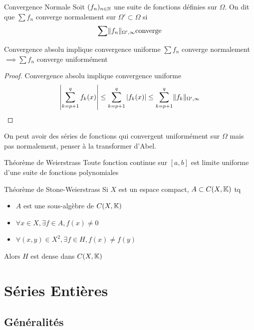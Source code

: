 \documentclass[]{report}
\begin{document}
\begin{df}{Convergence Normale}{}
    Soit $(f_n)_{n\in\mathbb{N}}$ une suite de fonctions définies sur $\Omega$. On dit que $\sum f_n$ converge normalement sur $\Omega'\subset \Omega$ si
    \[\sum \lVert f_n \rVert_{\Omega',\infty} \text{converge}\]
\end{df}

\begin{prop}{Convergence absolu implique convergence uniforme}{}
    $\sum f_n$ converge normalement $\implies \sum f_n$ converge uniformément
\end{prop}

\begin{proof}{Convergence absolu implique convergence uniforme}{}
    \[\left|\sum_{k=p+1}^{q} f_k(x)\right|\le \sum_{k=p+1}^{q} \left|f_k(x)\right|\le \sum_{k=p+1}^{q}\lVert f_k \rVert_{\Omega',\infty}\]
\end{proof}

\begin{re}{}{}
    On peut avoir des séries de fonctions qui convergent uniformément sur $\Omega$ mais pas normalement, penser à la transformer d'Abel.
\end{re}

\begin{tm}{Théorème de Weierstrass}{}
    Toute fonction continue sur $[a,b]$ est limite uniforme d'une suite de fonctions polynomiales
\end{tm}

\begin{tm}{Théorème de Stone-Weierstrass}{}
    Si $X$ est un espace compact, $A\subset C(X,\mathbb{K})$ tq
    \begin{itemize}
        \item $A$ est une sous-algèbre de $C(X,\mathbb{K})$
        \item $\forall x\in X,\exists f\in A,f(x)\neq 0$
        \item $\forall (x,y)\in X^2,\exists f\in H, f(x)\neq f(y)$
    \end{itemize}
    Alors $H$ est dense dans $C(X,\mathbb{K})$
\end{tm}

\section{Séries Entières}

\subsection{Généralités}
\end{document}

